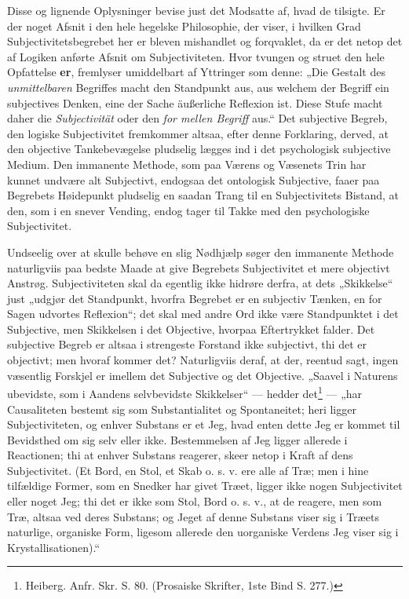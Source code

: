 \documentclass[11pt]{book}
\newcommand{\opage}[1]{\marginnote{\footnotesize\textit{[#1]}}}
\begin{document}
Disse og lignende Oplysninger bevise just det Modsatte af, hvad de
tilsigte. Er der noget Afsnit i den hele hegelske Philosophie, der viser,
i hvilken Grad Subjectivitetsbegrebet her er bleven mishandlet og
forqvaklet, da er det netop det af Logiken anførte Afsnit om
Subjectiviteten. Hvor tvungen og struet den hele Opfattelse \textbf{er},
fremlyser umiddelbart af Yttringer som denne: „Die Gestalt des
\emph{unmittelbaren} Begriffes macht den Standpunkt aus, aus welchem der
Begriff ein subjectives Denken, eine der Sache äußerliche Reflexion ist.
\opage{141} \setcounter{footnote}{0}%
Diese Stufe macht daher die \emph{Subjectivität} oder den \emph{for\-%
mellen Begriff} aus.“ Det subjective Begreb, den logiske Subjectivitet
fremkommer altsaa, efter denne Forklaring, derved, at den objective
Tankebevægelse pludselig lægges ind i det psychologisk subjective Medium.
Den immanente Methode, som paa Værens og Væsenets Trin har kunnet undvære
alt Subjectivt, endogsaa det ontologisk Subjective, faaer paa Begrebets
Høidepunkt pludselig en saadan Trang til en Subjectivitets Bistand, at
den, som i en snever Vending, endog tager til Takke med den psychologiske
Subjectivitet.

Undseelig over at skulle behøve en slig Nødhjælp søger den immanente
Methode naturligviis paa bedste Maade at give Begrebets Subjectivitet et
mere objectivt Anstrøg. Subjectiviteten skal da egentlig ikke hidrøre
derfra, at dets „Skikkelse“ just „udgjør det Standpunkt, hvorfra Begrebet
er en subjectiv Tænken, en for Sagen udvortes Reflexion“; det skal med
andre Ord ikke være Standpunktet i det Subjective, men Skikkelsen i det
Objective, hvorpaa Eftertrykket falder. Det subjective Begreb er altsaa i
strengeste Forstand ikke subjectivt, thi det er objectivt; men hvoraf
kommer det? Naturligviis deraf, at der, reentud sagt, ingen væsentlig
Forskjel er imellem det Subjective og det Objective. „Saavel i Naturens
ubevidste, som i Aandens selvbevidste Skikkelser“ --- hedder
det\footnote{Heiberg. Anfr. Skr. S. 80. (Prosaiske Skrifter, 1ste Bind S.
277.)}
--- „har Causaliteten bestemt sig som Substantialitet og Spontaneitet;
heri ligger Subjectiviteten, og enhver Substans er et Jeg, hvad enten
dette Jeg er kommet til Bevidsthed om sig selv eller ikke. Bestemmelsen af
Jeg ligger allerede i Reactionen; thi at enhver Substans reagerer, skeer
netop i Kraft af dens Subjectivitet. (Et Bord, en Stol, et Skab o. s. v.
ere alle af Træ; men i hine tilfældige Former, som en Snedker har givet
Træet, ligger ikke nogen Subjectivitet eller noget Jeg; thi det er ikke
som Stol, Bord o. s. v., at de
\opage{142} \setcounter{footnote}{0}%
reagere, men som Træ, altsaa ved deres Substans; og Jeget af denne
Substans viser sig i Træets naturlige, organiske Form, ligesom allerede
den uorganiske Verdens Jeg viser sig i Krystallisationen).“
\end{document}
